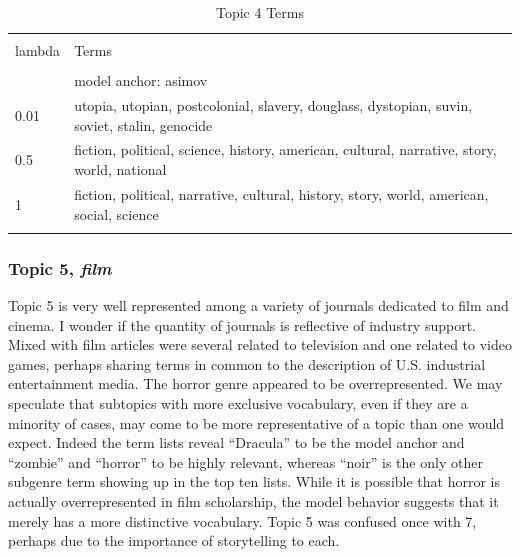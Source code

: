 \documentclass[]{book}
\theoremstyle{definition}
\theoremstyle{definition}
\theoremstyle{definition}
\theoremstyle{remark}
\begin{document}
\begin{table}[!htbp] \centering 
  \caption{Topic 4 Terms} 
  \label{tab:t4d} 
\begin{tabularx}{\textwidth}{@{\extracolsep{5pt}} lY} 
\\[-1.8ex]\hline 
\hline \\[-1.8ex] 
lambda & Terms \\ 
\hline \\[-1.8ex] 
 & model anchor: asimov \\ 
0.01 & utopia, utopian, postcolonial, slavery, douglass, dystopian, suvin, soviet, stalin, genocide \\ 
0.5 & fiction, political, science, history, american, cultural, narrative, story, world, national \\ 
1 & fiction, political, narrative, cultural, history, story, world, american, social, science \\ 
\hline \\[-1.8ex] 
\end{tabularx} 
\end{table}

\hypertarget{topic-5-film}{%
\subsubsection{\texorpdfstring{Topic 5,
\emph{film}}{Topic 5, film}}\label{topic-5-film}}

Topic 5 is very well represented among a variety of journals dedicated
to film and cinema. I wonder if the quantity of journals is reflective
of industry support. Mixed with film articles were several related to
television and one related to video games, perhaps sharing terms in
common to the description of U.S. industrial entertainment media. The
horror genre appeared to be overrepresented. We may speculate that
subtopics with more exclusive vocabulary, even if they are a minority of
cases, may come to be more representative of a topic than one would
expect. Indeed the term lists reveal ``Dracula'' to be the model anchor
and ``zombie'' and ``horror'' to be highly relevant, whereas ``noir'' is
the only other subgenre term showing up in the top ten lists. While it
is possible that horror is actually overrepresented in film scholarship,
the model behavior suggests that it merely has a more distinctive
vocabulary. Topic 5 was confused once with 7, perhaps due to the
importance of storytelling to each.
\end{document}
